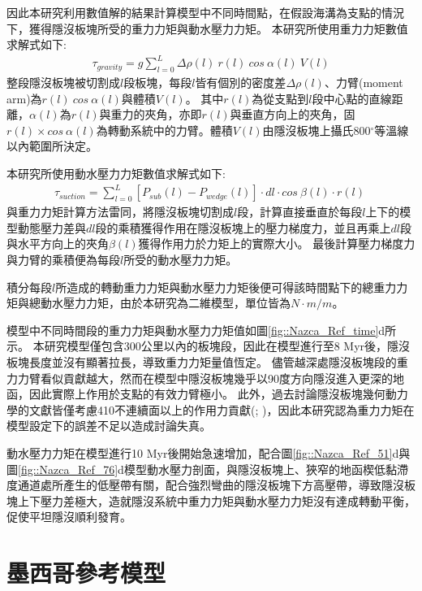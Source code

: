 因此本研究利用數值解的結果計算模型中不同時間點，在假設海溝為支點的情況下，獲得隱沒板塊所受的重力力矩與動水壓力力矩。
本研究所使用重力力矩數值求解式如下:
\begin{align}
    \tau_{gravity} =  g\sum ^L_{l=0} \Delta \rho(l)\ r(l)\ cos\ \alpha (l)\ V(l) 
    \label{eqn:tau_gravity}
\end{align}
整段隱沒板塊被切割成$l$段板塊，每段$l$皆有個別的密度差$\Delta \rho(l)$、力臂(moment arm)為$r(l)\ cos\ \alpha (l)$與體積$V(l)$。
其中$r(l)$為從支點到$l$段中心點的直線距離，$ \alpha (l)$為$r(l)$與重力的夾角，亦即$r(l)$與垂直方向上的夾角，固$r(l)\times cos\ \alpha (l)$為轉動系統中的力臂。體積$V(l)$由隱沒板塊上攝氏800$^{\circ}$等溫線以內範圍所決定。

本研究所使用動水壓力力矩數值求解式如下:
\begin{align}
    \tau_{suction} =  \sum ^L_{l=0} [P_{sub}(l)-P_{wedge}(l)]\cdot dl \cdot cos\ \beta(l)\cdot r(l)\ 
    \label{eqn:tau_suction}
\end{align}
與重力力矩計算方法雷同，將隱沒板塊切割成$l$段，計算直接垂直於每段$l$上下的模型動態壓力差與$dl$段的乘積獲得作用在隱沒板塊上的壓力梯度力，並且再乘上$dl$段與水平方向上的夾角$\beta(l)$獲得作用力於力矩上的實際大小。
最後計算壓力梯度力與力臂的乘積便為每段$l$所受的動水壓力力矩。

積分每段$l$所造成的轉動重力力矩與動水壓力力矩後便可得該時間點下的總重力力矩與總動水壓力力矩，由於本研究為二維模型，單位皆為$N\cdot m/m$。

模型中不同時間段的重力力矩與動水壓力力矩值如圖\ref{fig::Nazca_Ref_time}d所示。
本研究模型僅包含300公里以內的板塊段，因此在模型進行至8 Myr後，隱沒板塊長度並沒有顯著拉長，導致重力力矩量值恆定。
儘管越深處隱沒板塊段的重力力臂看似貢獻越大，然而在模型中隱沒板塊幾乎以90度方向隱沒進入更深的地函，因此實際上作用於支點的有效力臂極小。
此外，過去討論隱沒板塊幾何動力學的文獻皆僅考慮410不連續面以上的作用力貢獻(\citealp{schellart2004quantifying}; \citealp{billen2008modeling})，因此本研究認為重力力矩在模型設定下的誤差不足以造成討論失真。

動水壓力力矩在模型進行10 Myr後開始急速增加，配合圖\ref{fig::Nazca_Ref_51}d與圖\ref{fig::Nazca_Ref_76}d模型動水壓力剖面，與隱沒板塊上、狹窄的地函楔低黏滯度通道處所產生的低壓帶有關，配合強烈彎曲的隱沒板塊下方高壓帶，導致隱沒板塊上下壓力差極大，造就隱沒系統中重力力矩與動水壓力力矩沒有達成轉動平衡，促使平坦隱沒順利發育。

\newpage
\section{墨西哥參考模型}
